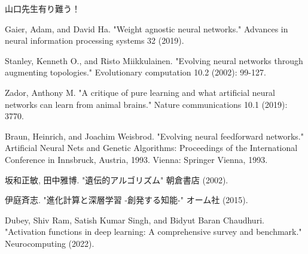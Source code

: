 \documentclass[12pt, dvipdfmx]{jarticle}
\begin{document}

\tableofcontents %
\clearpage %



\clearpage


\clearpage

山口先生有り難う！ %

\begin{thebibliography}{99} %
     Gaier, Adam, and David Ha. "Weight agnostic neural networks." Advances in neural information processing systems 32 (2019).

     Stanley, Kenneth O., and Risto Miikkulainen. "Evolving neural networks through augmenting topologies." Evolutionary computation 10.2 (2002): 99-127.

     Zador, Anthony M. "A critique of pure learning and what artificial neural networks can learn from animal brains." Nature communications 10.1 (2019): 3770.

     Braun, Heinrich, and Joachim Weisbrod. "Evolving neural feedforward networks." Artificial Neural Nets and Genetic Algorithms: Proceedings of the International Conference in Innsbruck, Austria, 1993. Vienna: Springer Vienna, 1993.

     坂和正敏, 田中雅博. "遺伝的アルゴリズム" 朝倉書店 (2002).

     伊庭斉志. "進化計算と深層学習 -創発する知能-" オーム社 (2015). 

     Dubey, Shiv Ram, Satish Kumar Singh, and Bidyut Baran Chaudhuri. "Activation functions in deep learning: A comprehensive survey and benchmark." Neurocomputing (2022).
\end{thebibliography}
\end{document}

